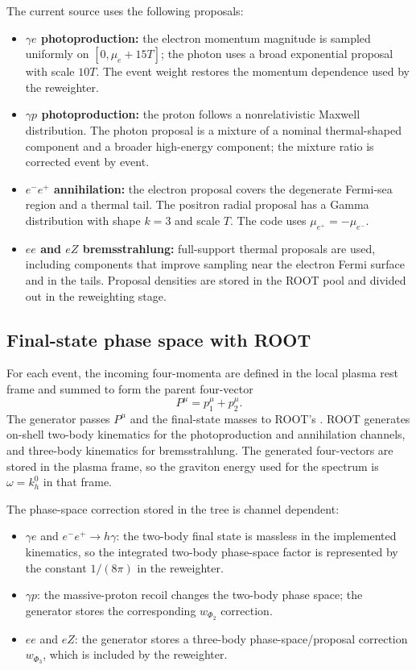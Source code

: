 \documentclass[11pt,a4paper]{article}
\newcommand{\code}[1]{\texttt{\detokenize{#1}}}
\begin{document}
The current source uses the following proposals:
\begin{itemize}
  \item \textbf{$\gamma e$ photoproduction:} the electron momentum magnitude is sampled uniformly on $[0,\mu_e+15T]$; the photon uses a broad exponential proposal with scale $10T$. The event weight restores the momentum dependence used by the reweighter.
  \item \textbf{$\gamma p$ photoproduction:} the proton follows a nonrelativistic Maxwell distribution. The photon proposal is a mixture of a nominal thermal-shaped component and a broader high-energy component; the mixture ratio is corrected event by event.
  \item \textbf{$e^-e^+$ annihilation:} the electron proposal covers the degenerate Fermi-sea region and a thermal tail. The positron radial proposal has a Gamma distribution with shape $k=3$ and scale $T$. The code uses $\mu_{e^+}=-\mu_{e^-}$.
  \item \textbf{$ee$ and $eZ$ bremsstrahlung:} full-support thermal proposals are used, including components that improve sampling near the electron Fermi surface and in the tails. Proposal densities are stored in the ROOT pool and divided out in the reweighting stage.
\end{itemize}

\subsection{Final-state phase space with ROOT}

For each event, the incoming four-momenta are defined in the local plasma rest frame and summed to form the parent four-vector
\begin{equation}
 P^\mu = p_1^\mu+p_2^\mu.
\end{equation}
The generator passes $P^\mu$ and the final-state masses to ROOT's \code{TGenPhaseSpace}. ROOT generates on-shell two-body kinematics for the photoproduction and annihilation channels, and three-body kinematics for bremsstrahlung. The generated four-vectors are stored in the plasma frame, so the graviton energy used for the spectrum is $\omega=k_h^0$ in that frame.

The phase-space correction stored in the tree is channel dependent:
\begin{itemize}
  \item $\gamma e$ and $e^-e^+\to h\gamma$: the two-body final state is massless in the implemented kinematics, so the integrated two-body phase-space factor is represented by the constant $1/(8\pi)$ in the reweighter.
  \item $\gamma p$: the massive-proton recoil changes the two-body phase space; the generator stores the corresponding $w_{\Phi_2}$ correction.
  \item $ee$ and $eZ$: the generator stores a three-body phase-space/proposal correction $w_{\Phi_3}$, which is included by the reweighter.
\end{itemize}
\end{document}
